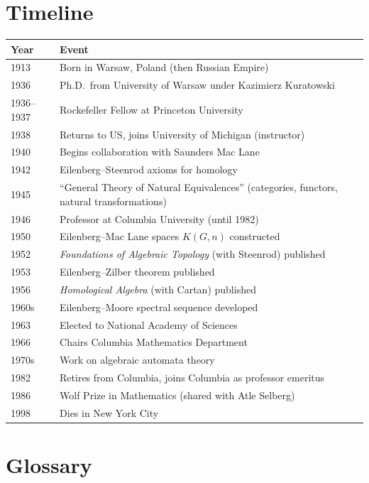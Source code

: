\section*{Timeline}

\begin{tabularx}{\linewidth}{|p{1.5cm}|>{\raggedright\arraybackslash}X|}
\hline
\textbf{Year} & \textbf{Event} \\ \hline
1913 & Born in Warsaw, Poland (then Russian Empire) \\ \hline
1936 & Ph.D.\ from University of Warsaw under Kazimierz Kuratowski \\ \hline
1936--1937 & Rockefeller Fellow at Princeton University \\ \hline
1938 & Returns to US, joins University of Michigan (instructor) \\ \hline
1940 & Begins collaboration with Saunders Mac Lane \\ \hline
1942 & Eilenberg--Steenrod axioms for homology \\ \hline
1945 & ``General Theory of Natural Equivalences'' (categories, functors, natural transformations) \\ \hline
1946 & Professor at Columbia University (until 1982) \\ \hline
1950 & Eilenberg--Mac Lane spaces $K(G,n)$ constructed \\ \hline
1952 & \textit{Foundations of Algebraic Topology} (with Steenrod) published \\ \hline
1953 & Eilenberg--Zilber theorem published \\ \hline
1956 & \textit{Homological Algebra} (with Cartan) published \\ \hline
1960s & Eilenberg--Moore spectral sequence developed \\ \hline
1963 & Elected to National Academy of Sciences \\ \hline
1966 & Chairs Columbia Mathematics Department \\ \hline
1970s & Work on algebraic automata theory \\ \hline
1982 & Retires from Columbia, joins Columbia as professor emeritus \\ \hline
1986 & Wolf Prize in Mathematics (shared with Atle Selberg) \\ \hline
1998 & Dies in New York City \\ \hline
\end{tabularx}

\section*{Glossary}

